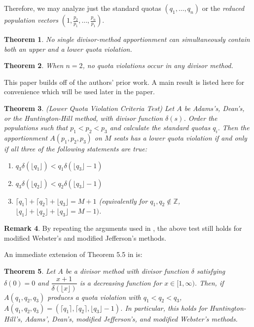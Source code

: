\documentclass[11pt]{article}
\newtheorem{theorem}{Theorem}[section]
\theoremstyle{definition}
\newtheorem{remark}[theorem]{Remark}
\theoremstyle{definition}
\begin{document}
Therefore, we may analyze just the standard quotas $  (q_1, \dots, q_n)$ or the
\emph{reduced population vectors} $\left(1,\frac{p_2}{p_1}, \dots, \frac{p_n}{p_1} \right)$.


\begin{theorem}\label{no_up_and_down}\parencite{b-young_textbook} No single divisor-method apportionment can simultaneously contain both an upper and a lower quota violation. \end{theorem}

\begin{theorem}\label{no_vio_n=2}\parencite{b-young_textbook} When $n=2$, no quota violations occur in any divisor method. \end{theorem}

This paper builds off of the authors' prior work. A main result is listed here for convenience which will be used later in the paper. 

\begin{theorem}\label{q.v_criteria_test} \parencite{Self} \textit{(Lower Quota Violation Criteria Test)} Let $A$ be Adams's, Dean's, or the Huntington-Hill method, with divisor function $\delta(s)$. Order the populations such that $p_1 <p_2 < p_3$ and calculate the standard quotas $q_i$. Then the apportionment $A(p_1, p_2, p_3)$ on $M$ seats has a lower quota violation if and only if all three of the following statements are true: 
\begin{enumerate}
\item $q_3 \delta(\lfloor q_1 \rfloor) < q_1 \delta( \lfloor q_3 \rfloor - 1)$
\item $q_3 \delta(\lfloor q_2 \rfloor) < q_2 \delta( \lfloor q_3 \rfloor - 1)$
\item $\lceil q_1 \rceil + \lceil q_2 \rceil + \lfloor q_3 \rfloor = M+1 $ (equivalently for $q_1, q_2 \notin \mathbb{Z}$, $\lfloor q_1 \rfloor + \lfloor q_2 \rfloor + \lfloor q_3 \rfloor = M-1) $.
\end{enumerate}
\end{theorem}

\begin{remark}
By repeating the arguments used in \parencite{Self}, the above test still holds for modified Webster's and modified Jefferson's methods.
\end{remark}

An immediate extension of Theorem 5.5 in \parencite{Self} is:

\begin{theorem}\label{36}
Let $A$ be a divisor method with divisor function $\delta$ satisfying $\delta(0) = 0$ and $\dfrac{x+1}{\delta(\lfloor x \rfloor)}$ is a decreasing function for $x \in [1, \infty)$. Then, if $A(q_1, q_2, q_3)$ produces a quota violation with $q_1<q_2<q_3$, $A(q_1, q_2, q_3) =(\lceil q_1 \rceil, \lceil q_2 \rceil, \lfloor q_3 \rfloor -1)$. In particular, this holds for Huntington-Hill's, Adams', Dean's, modified Jefferson's, and modified Webster's methods.
\end{theorem}
\end{document}
